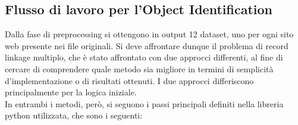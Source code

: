 \documentclass[a4paper,12pt]{article}
\begin{document}
\newpage
\subsection{Flusso di lavoro per l'Object Identification}
Dalla fase di preprocessing si ottengono in output 12 dataset, uno per ogni sito web presente nei file originali. Si deve affrontare dunque il problema di record linkage multiplo, che è stato affrontato con due approcci differenti, al fine di cercare di comprendere quale metodo sia migliore in termini di semplicità d'implementazione o di risultati ottenuti. I due approcci differiscono principalmente per la logica iniziale. \\ %

\noindent In entrambi i metodi, però, si seguono i passi principali definiti nella libreria python utilizzata, che sono i seguenti:
\end{document}
